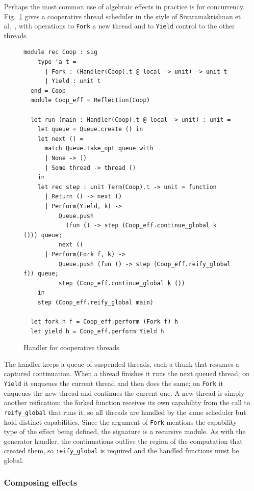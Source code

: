 \documentclass[acmsmall, screen, review, anonymous]{acmart}
\theoremstyle{definition}
\begin{document}
Perhaps the most common use of algebraic effects in practice is for
concurrency. Fig.~\ref{fig:coop} gives a cooperative thread scheduler
in the style of Sivaramakrishnan et
al.~\cite{Sivaramakrishnan2021retrofitting}, with operations to
\lstinline[style=oxcaml]{Fork} a new thread and to
\lstinline[style=oxcaml]{Yield} control to the other threads.
\begin{figure}
\begin{lstlisting}[style=oxcaml]
  module rec Coop : sig
    type 'a t =
      | Fork : (Handler(Coop).t @ local -> unit) -> unit t
      | Yield : unit t
  end = Coop
  module Coop_eff = Reflection(Coop)

  let run (main : Handler(Coop).t @ local -> unit) : unit =
    let queue = Queue.create () in
    let next () =
      match Queue.take_opt queue with
      | None -> ()
      | Some thread -> thread ()
    in
    let rec step : unit Term(Coop).t -> unit = function
      | Return () -> next ()
      | Perform(Yield, k) ->
          Queue.push
            (fun () -> step (Coop_eff.continue_global k ())) queue;
          next ()
      | Perform(Fork f, k) ->
          Queue.push (fun () -> step (Coop_eff.reify_global f)) queue;
          step (Coop_eff.continue_global k ())
    in
    step (Coop_eff.reify_global main)

  let fork h f = Coop_eff.perform (Fork f) h
  let yield h = Coop_eff.perform Yield h
\end{lstlisting}
\caption{Handler for cooperative threads}
\label{fig:coop}
\end{figure}
The handler keeps a queue of suspended threads, each a thunk that
resumes a captured continuation. When a thread finishes it runs the
next queued thread; on \lstinline[style=oxcaml]{Yield} it enqueues the
current thread and then does the same; on
\lstinline[style=oxcaml]{Fork} it enqueues the new thread and
continues the current one. A new thread is simply another
reification: the forked function receives its own capability from the
call to \lstinline[style=oxcaml]{reify_global} that runs it, so all
threads are handled by the same scheduler but hold distinct
capabilities. Since the argument of \lstinline[style=oxcaml]{Fork}
mentions the capability type of the effect being defined, the
signature is a recursive module. As with the generator handler, the
continuations outlive the region of the computation that created them,
so \lstinline[style=oxcaml]{reify_global} is required and the handled
functions must be global.

\subsubsection{Composing effects}
\label{sec:composition}
\end{document}
